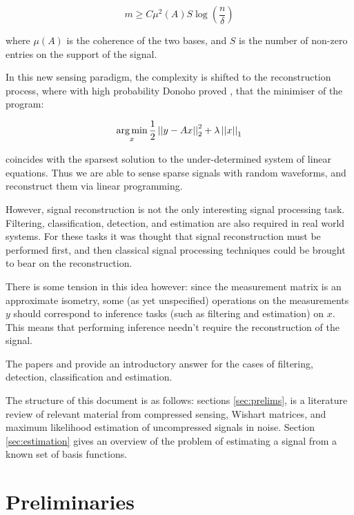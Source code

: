 \documentclass{article}
\begin{document}
\begin{equation}
m \geq C \mu^2(A) S \log\left(\frac{n}{\delta}\right)
\end{equation}
\label{minsamples}

where \( \mu(A)\) is the coherence of the two bases, and \(S\) is the number of non-zero entries on the support of the signal. 

In this new sensing paradigm, the complexity is shifted to the reconstruction process, where with high probability Donoho proved \cite{donoho2004neighborly}, that the minimiser of the program:

\begin{equation}
\operatorname*{arg\,min}_{x} \frac{1}{2}\left|\left|y-Ax\right|\right|_2^2 + \lambda\left|\left|x\right|\right|_1
\end{equation}

coincides with the sparsest solution to the under-determined system of linear equations. Thus we are able to sense sparse signals with random waveforms, and reconstruct them via linear programming.

However, signal reconstruction is not the only interesting signal processing task. Filtering, classification, detection, and estimation are also required in real world systems. For these tasks it was thought that signal reconstruction must be performed first, and then classical signal processing techniques could be brought to bear on the reconstruction. 

There is some tension in this idea however: since the measurement matrix is an approximate isometry, some (as yet unspecified) operations on the measurements \(y\) should correspond to inference tasks (such as filtering and estimation) on \(x\). This means that performing inference needn’t require the reconstruction of the signal. 

The papers \cite{davenport2010signal} and \cite{davenport2007smashed} provide an introductory answer for the cases of filtering, detection, classification and estimation.

The structure of this document is as follows: sections \eqref{sec:prelims}, is a literature review of relevant material from compressed sensing, Wishart matrices, and maximum likelihood estimation of uncompressed signals in noise. Section \eqref{sec:estimation} gives an overview of the problem of estimating a signal from a known set of basis functions. 

\section{Preliminaries} \label{sec:prelims}
\end{document}
